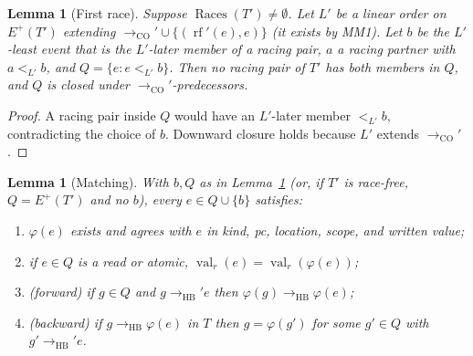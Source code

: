 \documentclass[11pt]{article}
\newtheorem{lemma}[theorem]{Lemma}
\theoremstyle{remark}
\DeclareMathOperator{\Races}{Races}
\DeclareMathOperator{\val}{val}
\DeclareMathOperator{\rf}{rf}
\newcommand{\HB}{\to_{\mathrm{HB}}}
\newcommand{\CO}{\to_{\mathrm{CO}}}
\newcommand{\Eplus}{E^{+}}
\begin{document}
\begin{lemma}[First race]\label{lem:first}
Suppose $\Races(T')\ne\emptyset$. Let $L'$ be a linear order on $\Eplus(T')$
extending $\CO'\cup\{(\rf'(e),e)\}$ (it exists by MM1). Let $b$ be the
$L'$-least event that is the $L'$-later member of a racing pair, $a$ a racing
partner with $a<_{L'}b$, and $Q=\{e:e<_{L'}b\}$. Then no racing pair of $T'$
has both members in $Q$, and $Q$ is closed under $\CO'$-predecessors.
\end{lemma}
\begin{proof}
A racing pair inside $Q$ would have an $L'$-later member $<_{L'}b$,
contradicting the choice of $b$. Downward closure holds because $L'$ extends
$\CO'$.
\end{proof}

\begin{lemma}[Matching]\label{lem:match}
With $b,Q$ as in Lemma~\ref{lem:first} (or, if $T'$ is race-free,
$Q=\Eplus(T')$ and no $b$), every $e\in Q\cup\{b\}$ satisfies:
\begin{enumerate}
\item[(i)] $\varphi(e)$ exists and agrees with $e$ in kind, pc, location, scope,
      and written value;
\item[(ii)] if $e\in Q$ is a read or atomic, $\val_r(e)=\val_r(\varphi(e))$;
\item[(iii)] (\emph{forward}) if $g\in Q$ and $g\HB' e$ then $\varphi(g)\HB\varphi(e)$;
\item[(iv)] (\emph{backward}) if $g\HB\varphi(e)$ in $T$ then $g=\varphi(g')$ for
      some $g'\in Q$ with $g'\HB' e$.
\end{enumerate}
\end{lemma}
\end{document}
